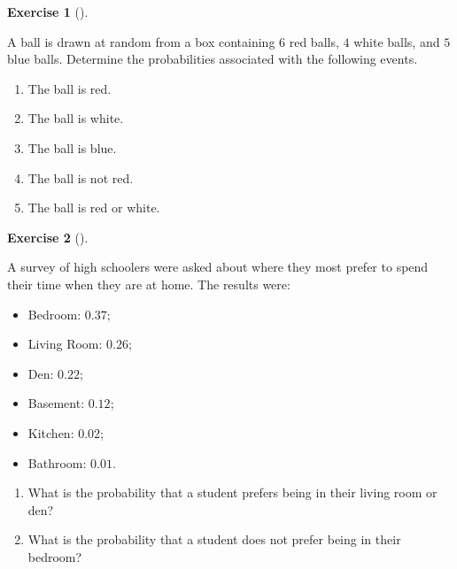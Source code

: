 \documentclass[
  letterpaper,
  DIV=11,
  numbers=noendperiod]{scrreprt}
\providecommand{\tightlist}{%
  \setlength{\itemsep}{0pt}\setlength{\parskip}{0pt}}\usepackage{longtable,booktabs,array}
\theoremstyle{definition}
\newtheorem{exercise}{Exercise}[chapter]
\theoremstyle{definition}
\theoremstyle{definition}
\theoremstyle{remark}
\begin{document}
\begin{exercise}[]\protect\hypertarget{exr-3.3}{}\label{exr-3.3}

A ball is drawn at random from a box containing \(6\) red balls, \(4\)
white balls, and \(5\) blue balls. Determine the probabilities
associated with the following events.

\begin{enumerate}
\def\labelenumi{\alph{enumi}.}
\tightlist
\item
  The ball is red.
\item
  The ball is white.
\item
  The ball is blue.
\item
  The ball is not red.
\item
  The ball is red or white.
\end{enumerate}

\end{exercise}

\begin{exercise}[]\protect\hypertarget{exr-3.4}{}\label{exr-3.4}

A survey of high schoolers were asked about where they most prefer to
spend their time when they are at home. The results were:

\begin{itemize}
\tightlist
\item
  Bedroom: \(0.37\);
\item
  Living Room: \(0.26\);
\item
  Den: \(0.22\);
\item
  Basement: \(0.12\);
\item
  Kitchen: \(0.02\);
\item
  Bathroom: \(0.01\).
\end{itemize}

\begin{enumerate}
\def\labelenumi{\alph{enumi}.}
\tightlist
\item
  What is the probability that a student prefers being in their living
  room or den?
\item
  What is the probability that a student does not prefer being in their
  bedroom?
\end{enumerate}

\end{exercise}
\end{document}
